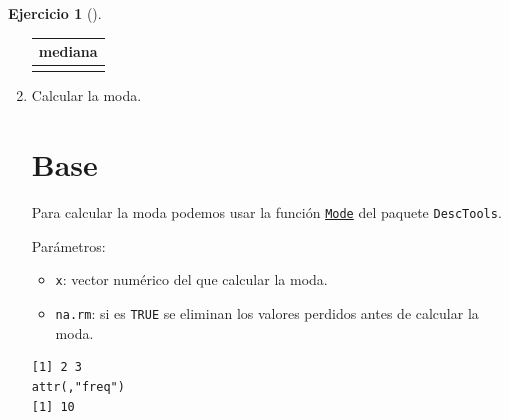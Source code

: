 \documentclass[
  spanish,
  a4paper,
]{scrreport}
\newenvironment{Shaded}{\begin{snugshade}}{\end{snugshade}}
\newcommand{\AttributeTok}[1]{\textcolor[rgb]{0.40,0.45,0.13}{#1}}
\newcommand{\ConstantTok}[1]{\textcolor[rgb]{0.56,0.35,0.01}{#1}}
\newcommand{\FunctionTok}[1]{\textcolor[rgb]{0.28,0.35,0.67}{#1}}
\newcommand{\NormalTok}[1]{\textcolor[rgb]{0.00,0.23,0.31}{#1}}
\newcommand{\SpecialCharTok}[1]{\textcolor[rgb]{0.37,0.37,0.37}{#1}}
\providecommand{\tightlist}{%
  \setlength{\itemsep}{0pt}\setlength{\parskip}{0pt}}
\theoremstyle{definition}
\newtheorem{exercise}{Ejercicio}[chapter]
\theoremstyle{remark}
\begin{document}
\begin{exercise}[]
\begin{enumerate}
\begin{tcolorbox}
  \begin{longtable}[]{@{}r@{}}
  \toprule\noalign{}
  mediana \\
  \midrule\noalign{}
  \endhead
  \bottomrule\noalign{}
  \endlastfoot
  2 \\
  \end{longtable}

  \end{tcolorbox}
\item
  Calcular la moda.

  \begin{tcolorbox}[enhanced jigsaw, colback=white, coltitle=black, toprule=.15mm, rightrule=.15mm, opacitybacktitle=0.6, opacityback=0, bottomtitle=1mm, toptitle=1mm, titlerule=0mm, breakable, leftrule=.75mm, title=\textcolor{quarto-callout-tip-color}{\faLightbulb}\hspace{0.5em}{Solución}, arc=.35mm, left=2mm, bottomrule=.15mm, colframe=quarto-callout-tip-color-frame, colbacktitle=quarto-callout-tip-color!10!white]

  \section{Base}

  Para calcular la moda podemos usar la función
  \href{https://www.rdocumentation.org/packages/DescTools/versions/0.99.0/topics/Mode}{\texttt{Mode}}
  del paquete \texttt{DescTools}.

  Parámetros:

  \begin{itemize}
  \tightlist
  \item
    \texttt{x}: vector numérico del que calcular la moda.
  \item
    \texttt{na.rm}: si es \texttt{TRUE} se eliminan los valores perdidos
    antes de calcular la moda.
  \end{itemize}

\begin{Shaded}
\end{Shaded}

\begin{verbatim}
[1] 2 3
attr(,"freq")
[1] 10
\end{verbatim}


\end{tcolorbox}
\end{enumerate}
\end{exercise}
\end{document}
